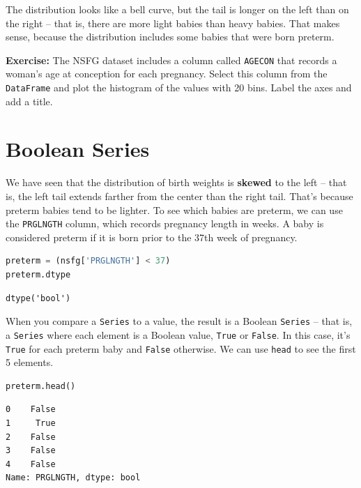 The distribution looks like a bell curve, but the tail is longer on the
left than on the right -- that is, there are more light babies than
heavy babies. That makes sense, because the distribution includes some
babies that were born preterm.

\textbf{Exercise:} The NSFG dataset includes a column called
\passthrough{\lstinline!AGECON!} that records a woman's age at
conception for each pregnancy. Select this column from the
\passthrough{\lstinline!DataFrame!} and plot the histogram of the values
with 20 bins. Label the axes and add a title.

\section{Boolean Series}\label{boolean-series}

We have seen that the distribution of birth weights is \textbf{skewed}
to the left -- that is, the left tail extends farther from the center
than the right tail. That's because preterm babies tend to be lighter.
To see which babies are preterm, we can use the
\passthrough{\lstinline!PRGLNGTH!} column, which records pregnancy
length in weeks. A baby is considered preterm if it is born prior to the
37th week of pregnancy.

\begin{lstlisting}[language=Python,style=source]
preterm = (nsfg['PRGLNGTH'] < 37)
preterm.dtype
\end{lstlisting}

\begin{lstlisting}[style=output]
dtype('bool')
\end{lstlisting}

When you compare a \passthrough{\lstinline!Series!} to a value, the
result is a Boolean \passthrough{\lstinline!Series!} -- that is, a
\passthrough{\lstinline!Series!} where each element is a Boolean value,
\passthrough{\lstinline!True!} or \passthrough{\lstinline!False!}. In
this case, it's \passthrough{\lstinline!True!} for each preterm baby and
\passthrough{\lstinline!False!} otherwise. We can use
\passthrough{\lstinline!head!} to see the first 5 elements.

\begin{lstlisting}[language=Python,style=source]
preterm.head()
\end{lstlisting}

\begin{lstlisting}[style=output]
0    False
1     True
2    False
3    False
4    False
Name: PRGLNGTH, dtype: bool
\end{lstlisting}


